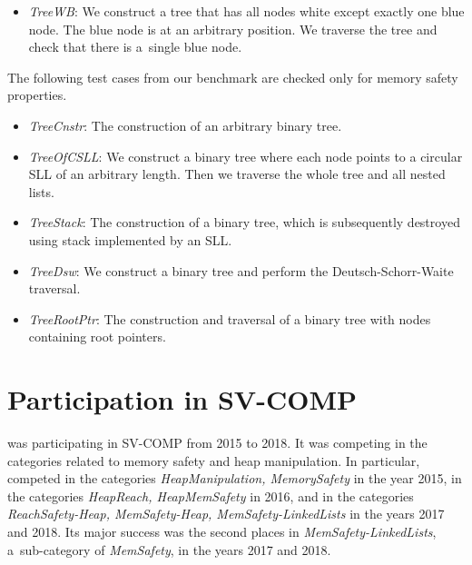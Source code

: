 {\begin{itemize}
    The nodes also need to have parent pointers to allow the transposition.
  \item \emph{TreeWB}: We construct a tree that has all nodes white except exactly one blue node.
    The blue node is at an arbitrary position. We traverse the tree and check
    that there is a~single blue node.
\end{itemize}

The following test cases from our benchmark are checked only for memory safety properties.
\begin{itemize}
	\item \emph{TreeCnstr}: The construction of an arbitrary binary tree.
	\item \emph{TreeOfCSLL}: We construct a binary tree where each node points to a circular SLL
		of an arbitrary length. Then we traverse the whole tree and all nested lists.
	\item \emph{TreeStack}: The construction of a binary tree, which is subsequently destroyed using stack
		implemented by an SLL.
	\item \emph{TreeDsw}: We construct a binary tree and perform the Deutsch-Schorr-Waite traversal.
	\item \emph{TreeRootPtr}: The construction and traversal of a binary tree with nodes containing root pointers.
\end{itemize}

\section{Participation in SV-COMP}

\forester{} was participating in SV-COMP from 2015 to 2018.
It was competing in the categories related to memory safety and heap
manipulation.
In particular,
\forester{} competed in the categories \emph{HeapManipulation, MemorySafety} in the year 2015,
in the categories \emph{HeapReach, HeapMemSafety} in 2016, and
in the categories \emph{ReachSafety-Heap, MemSafety-Heap, MemSafety-LinkedLists} in the years 2017 and 2018.
Its major success was the second places in \emph{MemSafety-LinkedLists},
a~sub-category of \emph{MemSafety}, in the years 2017 and 2018.

}
